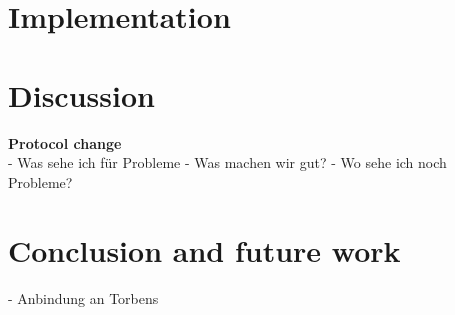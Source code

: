 \documentclass[sigconf]{acmart}
\begin{document}
\section{Implementation}


\section{Discussion}
\textbf{Protocol change}\\
- Was sehe ich für Probleme
- Was machen wir gut?
- Wo sehe ich noch Probleme?

\section{Conclusion and future work}
- Anbindung an Torbens 







\appendix
\end{document}
